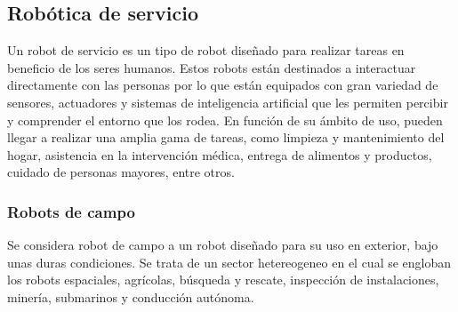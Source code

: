 \subsection{Robótica de servicio}
Un robot de servicio es un tipo de robot diseñado para realizar tareas en beneficio de los seres humanos. Estos robots están 
destinados a interactuar directamente con las personas por lo que están equipados con gran variedad de sensores, actuadores y sistemas de 
inteligencia artificial que les permiten percibir y comprender el entorno que los rodea. 
En función de su ámbito de uso, pueden llegar a realizar una amplia gama de tareas, como limpieza y mantenimiento del hogar, 
asistencia en la intervención médica, entrega de alimentos y productos, cuidado de personas mayores, entre otros.

\subsubsection{Robots de campo}
Se considera robot de campo a un robot diseñado para su uso en exterior, bajo unas duras condiciones. Se trata de un sector hetereogeneo en el cual se engloban los 
robots espaciales, agrícolas, búsqueda y rescate, inspección de instalaciones, minería, submarinos y conducción autónoma.
